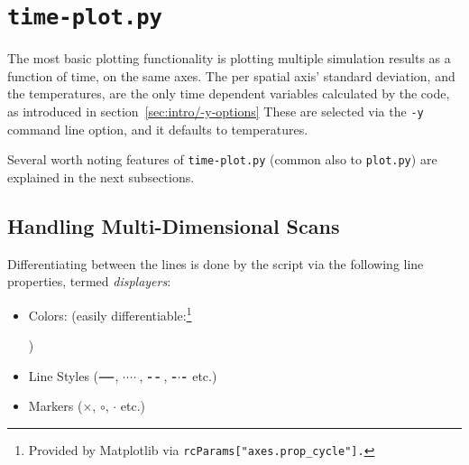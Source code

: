 \section{\texttt{time-plot.py}}

The most basic plotting functionality is plotting multiple simulation results as a function of time, on the same axes. The per spatial axis' standard deviation, and the temperatures, are the only time dependent variables calculated by the code, as introduced in section~\ref{sec:intro/-y-options} These are selected via the \texttt{-y} command line option, and it defaults to temperatures.

Several worth noting features of \texttt{time-plot.py} (common also to \texttt{plot.py}) are explained in the next subsections.

\subsection{Handling Multi-Dimensional Scans}\label{ssec:manual/displayers-dimensions}

Differentiating between the lines is done by the script via the following line properties, termed \textit{displayers}:

\begin{itemize}
	\item Colors: (easily differentiable:\footnote{Provided by Matplotlib via \texttt{rcParams["axes.prop\_cycle"].}} )
	\item Line Styles ($\tikz[baseline=-0.5ex]\draw[thick] (0,0) -- (0.4,0);$, $\tikz[baseline=-0.5ex]\draw[thick, dotted] (0,0) -- (0.4,0);$, $\tikz[baseline=-0.5ex]\draw[thick, dashed] (0,0) -- (0.4,0);$, $\tikz[baseline=-0.5ex]\draw[thick, dash dot] (0,0) -- (0.4,0);$ etc.)
	\item Markers ($\times$, $\circ$, $\cdot$ etc.)
\end{itemize}

